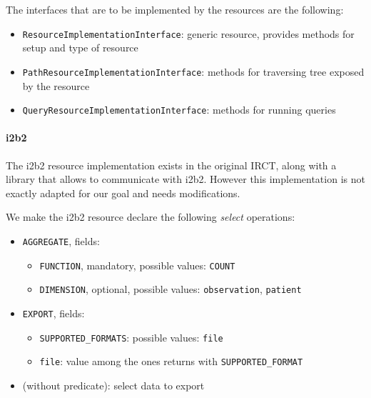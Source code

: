 The interfaces that are to be implemented by the resources are the following:
\begin{itemize}
    \item \verb|ResourceImplementationInterface|: generic resource, provides methods for setup and type of resource
    \item \verb|PathResourceImplementationInterface|: methods for traversing tree exposed by the resource
    \item \verb|QueryResourceImplementationInterface|: methods for running queries
\end{itemize}

\paragraph{i2b2}
The i2b2 resource implementation exists in the original IRCT, along with a library that allows to communicate with i2b2.
However this implementation is not exactly adapted for our goal and needs modifications.

We make the i2b2 resource declare the following \emph{select} operations:
\begin{itemize}
    \item \verb|AGGREGATE|, fields:
    \begin{itemize}
        \item \verb|FUNCTION|, mandatory, possible values:
        \verb|COUNT|
        
        \item \verb|DIMENSION|, optional, possible values:
        \verb|observation|,
        \verb|patient|
    \end{itemize}
    
    \item \verb|EXPORT|, fields:
    \begin{itemize}
        \item \verb|SUPPORTED_FORMATS|: possible values: \verb|file| %
        \item \verb|file|: value among the ones returns with \verb|SUPPORTED_FORMAT|
    \end{itemize}
    
    \item (without predicate): select data to export
\end{itemize}

